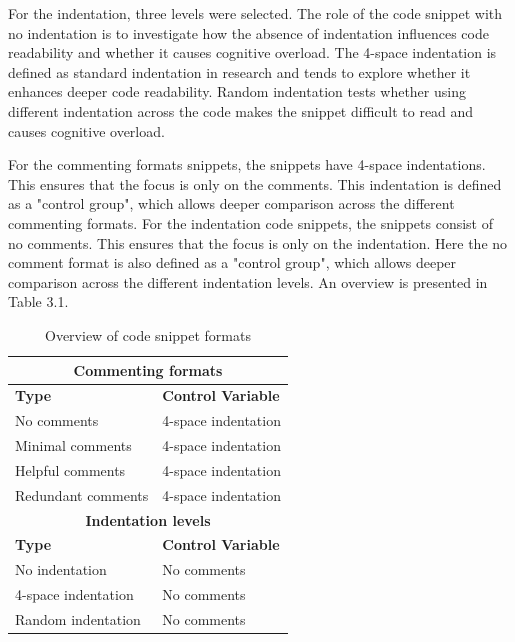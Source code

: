 For the indentation, three levels were selected. 
The role of the code snippet with no indentation is to investigate how the absence of indentation influences code readability and whether it causes cognitive overload.
The 4-space indentation is defined as standard indentation in research and tends to explore whether it enhances deeper code readability.  
Random indentation tests whether using different indentation across the code makes the snippet difficult to read and causes cognitive overload.


For the commenting formats snippets, the snippets have 4-space indentations. This ensures that the focus is only on the comments. This indentation is defined as a "control group", which allows deeper comparison across the different commenting formats. 
For the indentation code snippets, the snippets consist of no comments. This ensures that the focus is only on the indentation. Here the no comment format is also defined as a "control group", which allows deeper comparison across the different indentation levels. An overview is presented in Table 3.1.

\begin{table}[ht]
\centering
\small
\caption{Overview of code snippet formats}
\begin{tabular}{|p{6cm}|p{6cm}|}
\hline
\multicolumn{2}{|c|}{\rule{0pt}{1.2em}\textbf{Commenting formats}} \\[0.5em]
\hline
\rule{0pt}{1.2em}\textbf{Type} & \textbf{Control Variable} \\[0.5em]
\hline 
\rule{0pt}{1.2em}No comments & 4-space indentation \\[0.5em]
\hline
\rule{0pt}{1.2em}Minimal comments & 4-space indentation \\[0.5em]
\hline
\rule{0pt}{1.2em}Helpful comments & 4-space indentation \\[0.5em]
\hline
\rule{0pt}{1.2em}Redundant comments & 4-space indentation \\[0.5em]
\hline
\multicolumn{2}{|c|}{\rule{0pt}{1.2em}\textbf{Indentation levels}} \\[0.5em]
\hline
\rule{0pt}{1.2em}\textbf{Type} & \textbf{Control Variable} \\[0.5em]
\hline
\rule{0pt}{1.2em}No indentation & No comments \\[0.5em]
\hline
\rule{0pt}{1.2em}4-space indentation & No comments \\[0.5em]
\hline
\rule{0pt}{1.2em}Random indentation & No comments \\[0.5em]
\hline
\end{tabular}
\label{tab:snippet_control}
\end{table}



